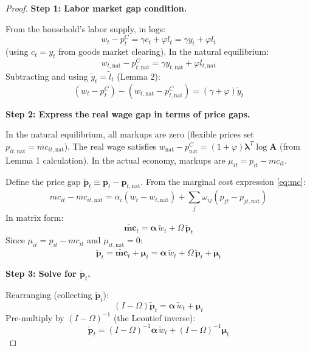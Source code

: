 \documentclass[12pt]{article}
\begin{document}
\begin{proof}
\textbf{Step 1: Labor market gap condition.}

From the household's labor supply, in logs:
\begin{equation}
    w_t - p_t^C = \gamma c_t + \varphi l_t = \gamma y_t + \varphi l_t
\end{equation}
(using $c_t = y_t$ from goods market clearing). In the natural equilibrium:
\begin{equation}
    w_{t,\mathrm{nat}} - p_{t,\mathrm{nat}}^C = \gamma y_{t,\mathrm{nat}} + \varphi l_{t,\mathrm{nat}}
\end{equation}
Subtracting and using $\tilde{y}_t = \tilde{l}_t$ (Lemma 2):
\begin{equation}
    (w_t - p_t^C) - (w_{t,\mathrm{nat}} - p_{t,\mathrm{nat}}^C) = (\gamma + \varphi)\tilde{y}_t
    \label{eq:wagegap_form}
\end{equation}

\textbf{Step 2: Express the real wage gap in terms of price gaps.}

In the natural equilibrium, all markups are zero (flexible prices set $p_{it,\mathrm{nat}} = mc_{it,\mathrm{nat}}$). The real wage satisfies $w_{\mathrm{nat}} - p_{\mathrm{nat}}^C = (1+\varphi)\bm{\lambda}^T\log\mathbf{A}$ (from Lemma 1 calculation). In the actual economy, markups are $\mu_{it} = p_{it} - mc_{it}$.

Define the price gap $\tilde{\bm{p}}_t \equiv \bm{p}_t - \bm{p}_{t,\mathrm{nat}}$. From the marginal cost expression \eqref{eq:mc}:
\begin{equation}
    mc_{it} - mc_{it,\mathrm{nat}} = \alpha_i(w_t - w_{t,\mathrm{nat}}) + \sum_j \omega_{ij}(p_{jt} - p_{jt,\mathrm{nat}})
\end{equation}
In matrix form:
\begin{equation}
    \tilde{\bm{mc}}_t = \bm{\alpha}\,\tilde{w}_t + \Omega\,\tilde{\bm{p}}_t
\end{equation}
Since $\mu_{it} = p_{it} - mc_{it}$ and $\mu_{it,\mathrm{nat}} = 0$:
\begin{equation}
    \tilde{\bm{p}}_t = \tilde{\bm{mc}}_t + \bm{\mu}_t = \bm{\alpha}\,\tilde{w}_t + \Omega\,\tilde{\bm{p}}_t + \bm{\mu}_t
\end{equation}

\textbf{Step 3: Solve for $\tilde{\bm{p}}_t$.}

Rearranging (collecting $\tilde{\bm{p}}_t$):
\begin{equation}
    (I - \Omega)\tilde{\bm{p}}_t = \bm{\alpha}\,\tilde{w}_t + \bm{\mu}_t
\end{equation}
Pre-multiply by $(I-\Omega)^{-1}$ (the Leontief inverse):
\begin{equation}
    \tilde{\bm{p}}_t = (I-\Omega)^{-1}\bm{\alpha}\,\tilde{w}_t + (I-\Omega)^{-1}\bm{\mu}_t
    \label{eq:pricegap}
\end{equation}


\end{proof}
\end{document}
